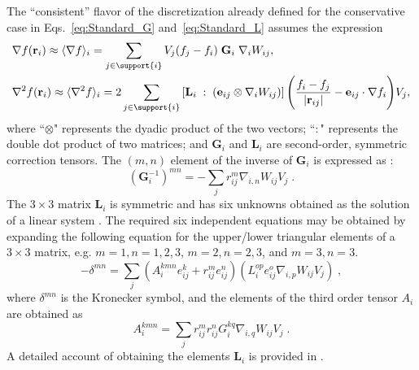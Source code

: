 \noindent The ``consistent'' flavor of the discretization already defined for the conservative case in Eqs.~\ref{eq:Standard_G} and~\ref{eq:Standard_L} assumes the expression \cite{fatehi2011,randles1996}
\begin{align}
&\nabla f(\mathbf r_i) \approx \langle \nabla f \rangle_i=\sum_{j \in \support{i}} V_j (f_j-f_i)\; \mathbf{G}_i\; \nabla_i W_{ij},\label{eq:Consistent_G}\\
&\nabla^2 f(\mathbf r_i) \approx \langle \nabla^2 f \rangle_i=2\sum_{j \in \support{i}}  \left[ \mathbf{L}_i \;:\;  (\mathbf{e}_{ij} \otimes \nabla_i W_{ij}) \right] \Bigg( \frac{f_i-f_j}{|\mathbf{r}_{ij}|}  - \mathbf{e}_{ij} \cdot \nabla f_i\Bigg) V_j,\label{eq:Consistent_L}
\end{align}
where ``$\otimes$" represents the dyadic product of the two vectors; ``$:$" represents the double dot product of two matrices; and $\mathbf{G}_i$ and $\mathbf{L}_i$ are  second-order, symmetric correction tensors. The  $(m,n)$ element of the inverse of $\mathbf{G}_{i}$ is expressed as \cite{Libersky1993,randles1996,fatehi2011}: 
\begin{equation}\label{eq:gradient_Gi}
(\textbf{G}_{i}^{-1})^{mn}=-\sum\limits_j r_{ij}^{m}\nabla_{i,n}W_{ij}V_{j} \;.
\end{equation}
\noindent The $3 \times 3$ matrix $\mathbf{L}_i$ is symmetric and has six unknowns obtained as the solution of a linear system \cite{fatehi2011}. The required six independent equations may be obtained by expanding the following equation for the upper/lower triangular elements of a $3 \times 3 $ matrix, e.g. $m=1,n=1,2,3$,   $m=2,n=2,3$, and $m=3,n=3$.
\begin{equation}\label{eq:delta_mn}
-\delta^{mn}=\sum\limits_j(A_{i}^{kmn}e_{ij}^{k}+r_{ij}^{m}e_{ij}^{n})(L_{i}^{op}e_{ij}^{o}\nabla_{i,p}W_{ij}V_{j}) \; ,
\end{equation}
where $\delta^{mn}$ is the Kronecker symbol, and the elements of the third order tensor $A_{i}$ are obtained as 
\begin{equation}\label{equ:Ai_kmn}
A_{i}^{kmn}=\sum\limits_j r_{ij}^{m} r_{ij}^{n}G_{i}^{kq}\nabla_{i,q}W_{ij}V_{j} \;.
\end{equation}
A detailed account of obtaining the elements $\textbf{L}_i$ is provided in \cite{TR-2016-14}. 

